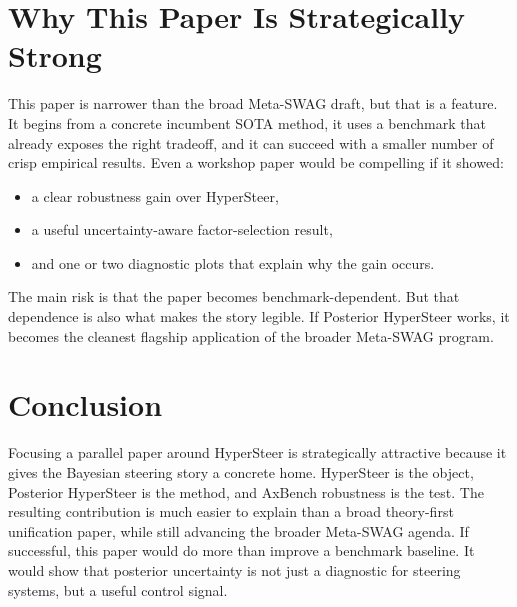 \documentclass[10pt]{article}
\begin{document}
\section{Why This Paper Is Strategically Strong}

This paper is narrower than the broad Meta-SWAG draft, but that is a feature. It begins from a concrete incumbent SOTA method, it uses a benchmark that already exposes the right tradeoff, and it can succeed with a smaller number of crisp empirical results. Even a workshop paper would be compelling if it showed:
\begin{itemize}[leftmargin=1.5em]
  \item a clear robustness gain over HyperSteer,
  \item a useful uncertainty-aware factor-selection result,
  \item and one or two diagnostic plots that explain why the gain occurs.
\end{itemize}

The main risk is that the paper becomes benchmark-dependent. But that dependence is also what makes the story legible. If Posterior HyperSteer works, it becomes the cleanest flagship application of the broader Meta-SWAG program.

\section{Conclusion}

Focusing a parallel paper around HyperSteer is strategically attractive because it gives the Bayesian steering story a concrete home. HyperSteer is the object, Posterior HyperSteer is the method, and AxBench robustness is the test. The resulting contribution is much easier to explain than a broad theory-first unification paper, while still advancing the broader Meta-SWAG agenda. If successful, this paper would do more than improve a benchmark baseline. It would show that posterior uncertainty is not just a diagnostic for steering systems, but a useful control signal.



\end{document}
